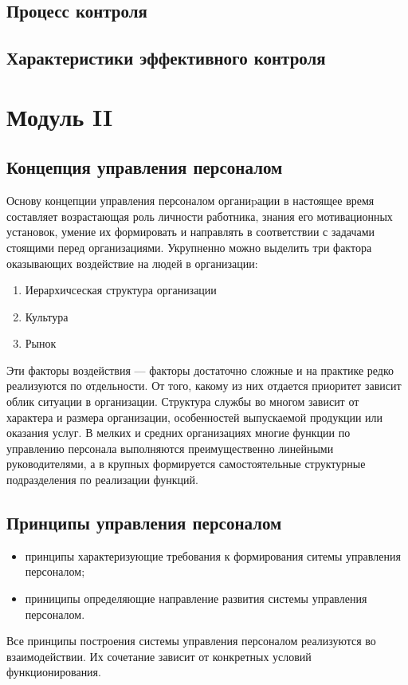 \documentclass[a4paper,12pt,oneside,final]{extarticle}
\numberwithin{equation}{section}
\begin{document}
\subsection{Процесс контроля}

\subsection{Характеристики эффективного контроля}

%
%
\section{Модуль II}
\subsection{Концепция управления персоналом}
Основу концепции управления персоналом органиpации в настоящее время составляет возрастающая роль личности работника, знания его мотивационных установок, умение их формировать и направлять в соответствии с задачами стоящими перед организациями. 
Укрупненно можно выделить три фактора оказывающих воздействие на людей в организации:
\begin{enumerate}
	\item Иерархичсеская структура организации
	\item Культура
	\item Рынок
\end{enumerate}
Эти факторы воздействия --- факторы достаточно сложные и на практике редко реализуются по отдельности. 
От того, какому из них отдается приоритет зависит облик ситуации в организации.
Структура службы во многом зависит от характера и размера организации, особенностей выпускаемой продукции или оказания услуг.
В мелких и средних организациях многие функции по управлению персонала выполняются преимущественно линейными руководителями, а в крупных формируется самостоятельные структурные подразделения по реализации функций.

\subsection{Принципы управления персоналом}
\begin{itemize}
	\item принципы характеризующие требования к формирования ситемы управления персоналом;
	\item приниципы определяющие направление развития системы управления персоналом.
\end{itemize}
Все принципы построения системы управления персоналом реализуются во взаимодействии. Их сочетание зависит от конкретных условий функционирования.
\end{document}
